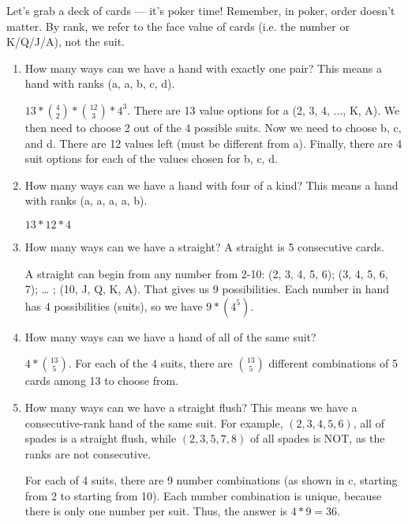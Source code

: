 \question 
Let's grab a deck of cards –-- it's poker time! Remember, in poker, order doesn’t matter. By rank, we refer to the face value of cards (i.e. the number or K/Q/J/A), not the suit.
\begin{enumerate}[label=(\alph*)]

\item
How many ways can we have a hand with exactly one pair? This means a hand with ranks (a, a, b, c, d).
	\begin{solution}
	$13 * {4 \choose 2} * {12 \choose 3} * 4^3$. 
	There are 13 value options for a (2, 3, 4, $\dots$, K, A). We then need to choose 2 out of the 4 possible suits. Now we need to choose b, c, and d. There are 12 values left (must be different from a). Finally, there are 4 suit options for each of the values chosen for b, c, d.
	\end{solution}

\item How many ways can we have a hand with four of a kind? This means a hand with ranks (a, a, a, a, b).
	\begin{solution} $13 * 12 * 4$ \end{solution}

\item How many ways can we have a straight? A straight is 5 consecutive cards.
	\begin{solution} A straight can begin from any number from 2-10: (2, 3, 4, 5, 6); (3, 4, 5, 6, 7); … ; (10, J, Q, K, A). That gives us 9 possibilities. Each number in hand has 4 possibilities (suits), so we have $9 * (4^5)$. \end{solution}

\item How many ways can we have a hand of all of the same suit? 
	\begin{solution} $4 * {13 \choose 5}$.
	For each of the 4 suits, there are ${13 \choose 5}$ different combinations of 5 cards among 13 to choose from.
	\end{solution}
	
\item How many ways can we have a straight flush? This means we have a consecutive-rank hand of the same suit. For example, $(2, 3, 4, 5, 6)$, all of spades is a straight flush, while $(2, 3, 5, 7, 8)$ of all spades is NOT, as the ranks are not consecutive. 
	\begin{solution}
	For each of 4 suits, there are 9 number combinations (as shown in c, starting from 2 to starting from 10). Each number combination is unique, because there is only one number per suit.
	Thus, the answer is $4 * 9 = 36$.
	\end{solution}

\end{enumerate}